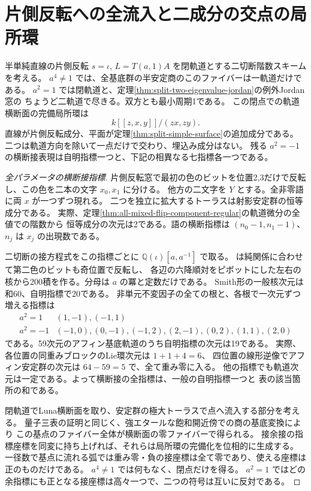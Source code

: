 \section{片側反転への全流入と二成分の交点の局所環}
\label{sec:mixed-flip-slice}
\begin{theorem}\label{thm:mixed-flip-slice}
半単純直線の片側反転 $s=\iota$, $L=T(a,1)A$ を閉軌道とする二切断階数スキームを考える。
$a^4\ne1$ では、全基底群の半安定商のこのファイバーは一軌道だけである。
$a^2=1$ では閉軌道と、定理\ref{thm:split-two-eigenvalue-jordan}の例外Jordan窓の
ちょうど二軌道で尽きる。双方とも最小周期1である。
この閉点での軌道横断面の完備局所環は
\[
                   k[[z,x,y]]/(zx,zy).
\]
直線が片側反転成分、平面が定理\ref{thm:split-simple-surface}の追加成分である。
二つは軌道方向を除いて一点だけで交わり、埋込み成分はない。
残る $a^2=-1$ の横断接表現は自明指標一つと、下記の相異なる七指標各一つである。
\end{theorem}
\begin{proof}[全パラメータの横断接指標]
片側反転窓で最初の色のビットを位置2,3だけで反転し、この色を二本の文字 $x_0,x_1$ に分ける。
他方の二文字を $Y$ とする。全非零語に両 $x$ が一つずつ現れる。
二つを独立に拡大するトーラスは射影安定群の恒等成分である。
実際、定理\ref{thm:all-mixed-flip-component-regular}の軌道微分の全値での階数から
恒等成分の次元は2である。語の横断指標は $(n_0-1,n_1-1)$、
$n_j$ は $x_j$ の出現数である。

二切断の接方程式をこの指標ごとに $\mathbb Q(\iota)[a,a^{-1}]$ で取る。
 は純関係に合わせて第二色のビットも奇位置で反転し、
各辺の六降順対をピボットにした左右の核から200積を作る。分母は $a$ の冪と定数だけである。
Smith形の一般核次元は和60、自明指標で20である。
非単元不変因子の全ての根と、各根で一次元ずつ増える指標は
\[
\begin{array}{c|l}
a^2=1 & (1,-1),(-1,1)\\
a^2=-1 & (-1,0),(0,-1),(-1,2),(2,-1),(0,2),(1,1),(2,0)
\end{array}
\]
である。59次元のアフィン基底軌道のうち自明指標の次元は19である。
実際、各位置の同重みブロックのLie環次元は $1+1+4=6$、
四位置の線形逆像でアフィン安定群の次元は $64-59=5$ で、全て重み零に入る。
他の指標でも軌道次元は一定である。よって横断接の全指標は、一般の自明指標一つと
表の該当箇所の和である。

閉軌道でLuna横断面を取り、安定群の極大トーラスで点へ流入する部分を考える。
量子三表の証明と同じく、強エタールな飽和開近傍での商の基底変換により
この基点のファイバー全体が横断面の零ファイバーで得られる。
接余接の指標座標を同変に持ち上げれば、それらは局所環の完備化を位相的に生成する。
一径数で基点に流れる弧では重み零・負の接座標は全て零であり、使える座標は正のものだけである。
$a^4\ne1$ では何もなく、閉点だけを得る。
$a^2=1$ ではどの余指標にも正となる接座標は高々一つで、二つの符号は互いに反対である。
\end{proof}

